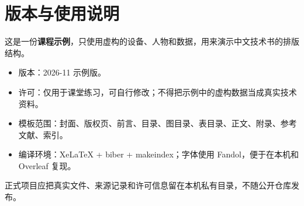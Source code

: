 \chapter*{版本与使用说明}
\thispagestyle{plain}

这是一份\textbf{课程示例}，只使用虚构的设备、人物和数据，用来演示中文技术书的排版结构。

\begin{itemize}[leftmargin=1.6em]
  \item 版本：2026-11 示例版。
  \item 许可：仅用于课堂练习，可自行修改；不得把示例中的虚构数据当成真实技术资料。
  \item 模板范围：封面、版权页、前言、目录、图目录、表目录、正文、附录、参考文献、索引。
  \item 编译环境：XeLaTeX + biber + makeindex；字体使用 Fandol，便于在本机和 Overleaf 复现。
\end{itemize}

正式项目应把真实文件、来源记录和许可信息留在本机私有目录，不随公开仓库发布。
